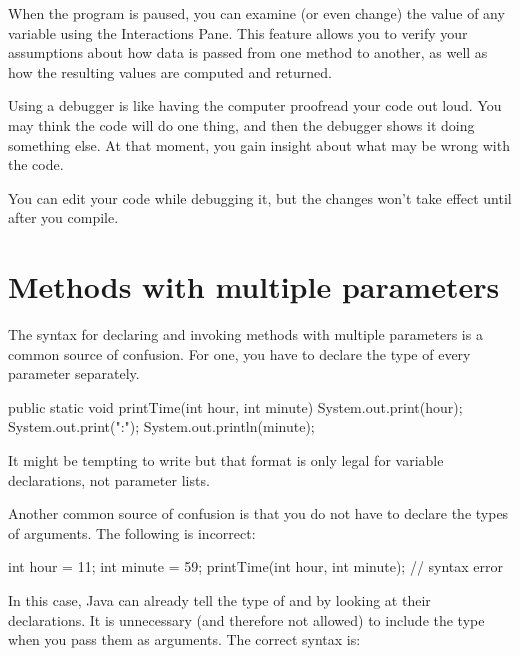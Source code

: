 When the program is paused, you can examine (or even change) the value of any variable using the Interactions Pane.
This feature allows you to verify your assumptions about how data is passed from one method to another, as well as how the resulting values are computed and returned.

Using a debugger is like having the computer proofread your code out loud.
You may think the code will do one thing, and then the debugger shows it doing something else.
At that moment, you gain insight about what may be wrong with the code.

You can edit your code while debugging it, but the changes won't take effect until after you compile.


\section{Methods with multiple parameters}
\label{time}


The syntax for declaring and invoking methods with multiple parameters is a common source of confusion.
For one, you have to declare the type of every parameter separately.

\begin{code}
    public static void printTime(int hour, int minute) {
        System.out.print(hour);
        System.out.print(":");
        System.out.println(minute);
    }
\end{code}

It might be tempting to write  but that format is only legal for variable declarations, not parameter lists.

Another common source of confusion is that you do not have to declare the types of arguments.
The following is incorrect:

\begin{code}
    int hour = 11;
    int minute = 59;
    printTime(int hour, int minute);  // syntax error
\end{code}

In this case, Java can already tell the type of  and  by looking at their declarations.
It is unnecessary (and therefore not allowed) to include the type when you pass them as arguments.
The correct syntax is:

